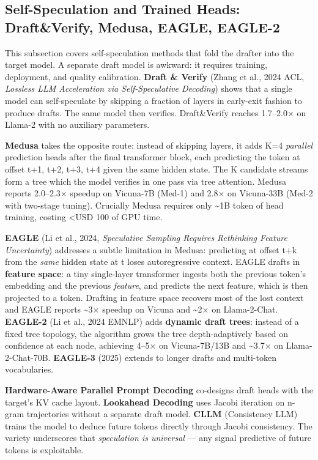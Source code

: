 \documentclass{article}
\begin{document}
\subsection{Self-Speculation and Trained Heads: Draft\&Verify, Medusa, EAGLE, EAGLE-2}\label{self-speculation-and-trained-heads-draftverify-medusa-eagle-eagle-2}

This subsection covers self-speculation methods that fold the drafter into the target model. A separate draft model is awkward: it requires training, deployment, and quality calibration. \textbf{Draft \& Verify} (Zhang et al., 2024 ACL, \emph{Lossless LLM Acceleration via Self-Speculative Decoding}) shows that a single model can self-speculate by skipping a fraction of layers in early-exit fashion to produce drafts. The same model then verifies. Draft\&Verify reaches 1.7--2.0× on Llama-2 with no auxiliary parameters.

\textbf{Medusa} \citep{cai20242024} takes the opposite route: instead of skipping layers, it adds K=4 \emph{parallel} prediction heads after the final transformer block, each predicting the token at offset t+1, t+2, t+3, t+4 given the same hidden state. The K candidate streams form a tree which the model verifies in one pass via tree attention. Medusa reports 2.0--2.3× speedup on Vicuna-7B (Med-1) and 2.8× on Vicuna-33B (Med-2 with two-stage tuning). Crucially Medusa requires only \textasciitilde1B token of head training, costing \textless USD 100 of GPU time.

\textbf{EAGLE} (Li et al., 2024, \emph{Speculative Sampling Requires Rethinking Feature Uncertainty}) addresses a subtle limitation in Medusa: predicting at offset t+k from the \emph{same} hidden state at t loses autoregressive context. EAGLE drafts in \textbf{feature space}: a tiny single-layer transformer ingests both the previous token's embedding and the previous \emph{feature}, and predicts the next feature, which is then projected to a token. Drafting in feature space recovers most of the lost context and EAGLE reports \textasciitilde3× speedup on Vicuna and \textasciitilde2× on Llama-2-Chat. \textbf{EAGLE-2} (Li et al., 2024 EMNLP) adds \textbf{dynamic draft trees}: instead of a fixed tree topology, the algorithm grows the tree depth-adaptively based on confidence at each node, achieving 4--5× on Vicuna-7B/13B and \textasciitilde3.7× on Llama-2-Chat-70B. \textbf{EAGLE-3} (2025) extends to longer drafts and multi-token vocabularies.

\textbf{Hardware-Aware Parallel Prompt Decoding} \citep{chen20242024} co-designs draft heads with the target's KV cache layout. \textbf{Lookahead Decoding} uses Jacobi iteration on n-gram trajectories without a separate draft model. \textbf{CLLM} (Consistency LLM) trains the model to deduce future tokens directly through Jacobi consistency. The variety underscores that \emph{speculation is universal} --- any signal predictive of future tokens is exploitable.
\end{document}
